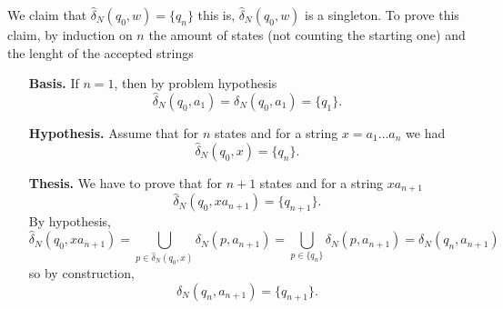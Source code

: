 \documentclass{article}
\newcommand{\NN}[2]{
    \hat{\delta}_{N}(#1, #2)
}
\theoremstyle{remark}
\begin{document}
\begin{enumerate}
    We claim that $\NN{q_0}{w} = \{q_n\}$ this is, $\NN{q_0}{w}$ is a singleton.
    To prove this claim, by induction on $n$ the amount of states (not counting the starting one) and the lenght of the accepted strings
    \begin{enumerate}
        \item[\textbf{Basis.}] If $n = 1$, then by problem hypothesis
        \[
        \NN{q_0}{a_1} = \delta_N(q_0,a_1) = \{q_1\}.
        \]
        \item[\textbf{Hypothesis.}] Assume that for $n$ states and for a string $x = a_1\dots a_n$ we had 
        \[
        \NN{q_0}{x} = \{q_n\}.
        \]

        \item[\textbf{Thesis.}] We have to prove that for $n+1$ states and for a string $xa_{n+1}$ 
        \[
        \NN{q_0}{xa_{n+1}} = \{q_{n+1}\}.
        \]
        By hypothesis, 
        \[
        \NN{q_0}{xa_{n+1}} = \bigcup_{p \in \NN{q_0}{x}}\delta_N(p,a_{n+1}) = \bigcup_{p \in \{q_n\}}\delta_N(p,a_{n+1}) = \delta_N(q_n,a_{n+1})
        \]
        so by construction, 
        \[
        \delta_N(q_n,a_{n+1}) = \{q_{n+1}\}.
        \]
    \end{enumerate}


\end{enumerate}
\end{document}
